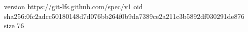 version https://git-lfs.github.com/spec/v1
oid sha256:0fc2adcc50180148d7d076bb264f0b9da7389ce2a211c3b5892df030291de876
size 76
